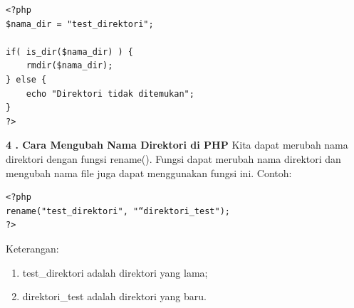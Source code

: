 \begin{lstlisting}
<?php
$nama_dir = "test_direktori";

if( is_dir($nama_dir) ) {
    rmdir($nama_dir); 
} else {
    echo "Direktori tidak ditemukan"; 
}
?>
\end{lstlisting}

\textbf{4 . Cara Mengubah Nama Direktori di PHP}
\newline
Kita dapat merubah nama direktori dengan fungsi rename(). Fungsi dapat merubah nama direktori dan mengubah nama file juga dapat menggunakan fungsi ini. Contoh:
\begin{lstlisting}
<?php 
rename("test_direktori", "“direktori_test"); 
?>
\end{lstlisting}

Keterangan:
\begin{enumerate}
\item test\_direktori adalah direktori yang lama;
\item direktori\_test adalah direktori yang baru.
\end{enumerate}

